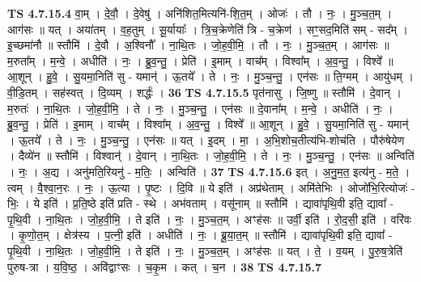 \documentclass[17pt]{extarticle}
\begin{document}
                  \newline
                                \textbf{ TS 4.7.15.4} \newline
                  वा॒म् । दे॒वौ॒ । दे॒वेषु॑ । अनि॑शित॒मित्यनि॑-शि॒त॒म् । ओजः॑ । तौ । नः॒ । मु॒ञ्च॒त॒म् । आग॑सः ॥ यत् । अया॑तम् । व॒ह॒तुम् । सू॒र्यायाः᳚ । त्रि॒च॒क्रेणेति॑ त्रि - च॒क्रेण॑ । सꣳ॒॒सद॒मिति॑ सम् - सद᳚म् । इ॒च्छमा॑नौ ॥ स्तौमि॑ । दे॒वौ । अ॒श्विनौ᳚ । ना॒थि॒तः । जो॒ह॒वी॒मि॒ । तौ । नः॒ । मु॒ञ्च॒त॒म् । आग॑सः ॥ म॒रुता᳚म् । म॒न्वे॒ । अधीति॑ । नः॒ । ब्रु॒व॒न्तु॒ । प्रेति॑ । इ॒माम् । वाच᳚म् । विश्वा᳚म् । अ॒व॒न्तु॒ । विश्वे᳚ ॥ आ॒शून् । हु॒वे॒ । सु॒यमा॒निति॑ सु - यमान्॑ । ऊ॒तये᳚ । ते । नः॒ । मु॒ञ्च॒न्तु॒ । एन॑सः ॥ ति॒ग्मम् । आयु॑धम् । वी॒डि॒तम् । सह॑स्वत् । दि॒व्यम् । शर्द्धः॑ । \textbf{  36} \newline
                  \newline
                                \textbf{ TS 4.7.15.5} \newline
                  पृत॑नासु । जि॒ष्णु ॥ स्तौमि॑ । दे॒वान् । म॒रुतः॑ । ना॒थि॒तः । जो॒ह॒वी॒मि॒ । ते । नः॒ । मु॒ञ्च॒न्तु॒ । एन॑सः ॥ दे॒वाना᳚म् । म॒न्वे॒ । अधीति॑ । नः॒ । ब्रु॒व॒न्तु॒ । प्रेति॑ । इ॒माम् । वाच᳚म् । विश्वा᳚म् । अ॒व॒न्तु॒ । विश्वे᳚ ॥ आ॒शून् । हु॒वे॒ । सु॒यमा॒निति॑ सु - यमान्॑ । ऊ॒तये᳚ । ते । नः॒ । मु॒ञ्च॒न्तु॒ । एन॑सः ॥ यत् । इ॒दम् । मा॒ । अ॒भि॒शोच॒तीत्य॑भि-शोच॑ति । पौरु॑षेयेण । दैव्ये॑न ॥ स्तौमि॑ । विश्वान्॑ । दे॒वान् । ना॒थि॒तः । जो॒ह॒वी॒मि॒ । ते । नः॒ । मु॒ञ्च॒न्तु॒ । एन॑सः ॥ अन्विति॑ । नः॒ । अ॒द्य । अनु॑मति॒रियनु॑ - म॒तिः॒ । अन्विति॑ । \textbf{  37} \newline
                  \newline
                                \textbf{ TS 4.7.15.6} \newline
                  इत् । अ॒नु॒म॒त॒ इत्य॑नु - म॒ते॒ । त्वम् । वै॒श्वा॒न॒रः । नः॒ । ऊ॒त्या । पृ॒ष्टः । दि॒वि ॥ ये इति॑ । अप्र॑थेताम् । अमि॑तेभिः । ओजो॑भि॒रित्योजः॑ - भिः॒ । ये इति॑ । प्र॒ति॒ष्ठे इति॑ प्रति - स्थे । अभ॑वताम् । वसू॑नाम् ॥ स्तौमि॑ । द्यावा॑पृथि॒वी इति॒ द्यावा᳚ - पृ॒थि॒वी । ना॒थि॒तः । जो॒ह॒वी॒मि॒ । ते इति॑ । नः॒ । मु॒ञ्च॒त॒म् । अꣳह॑सः ॥ उर्वी॒ इति॑ । रो॒द॒सी॒ इति॑ । वरि॑वः । कृ॒णो॒त॒म् । क्षेत्र॑स्य । प॒त्नी॒ इति॑ । अधीति॑ । नः॒ । ब्रू॒या॒त॒म् ॥ स्तौमि॑ । द्यावा॑पृथि॒वी इति॒ द्यावा᳚ - पृ॒थि॒वी । ना॒थि॒तः । जो॒ह॒वी॒मि॒ । ते इति॑ । नः॒ । मु॒ञ्च॒त॒म् । अꣳह॑सः ॥ यत् । ते॒ । व॒यम् । पु॒रु॒ष॒त्रेति॑ पुरुष-त्रा । य॒वि॒ष्ठ॒ । अवि॑द्वाꣳसः । च॒कृ॒म । कत् । च॒न । \textbf{  38} \newline
                  \newline
                                \textbf{ TS 4.7.15.7} \newline
\end{document}
